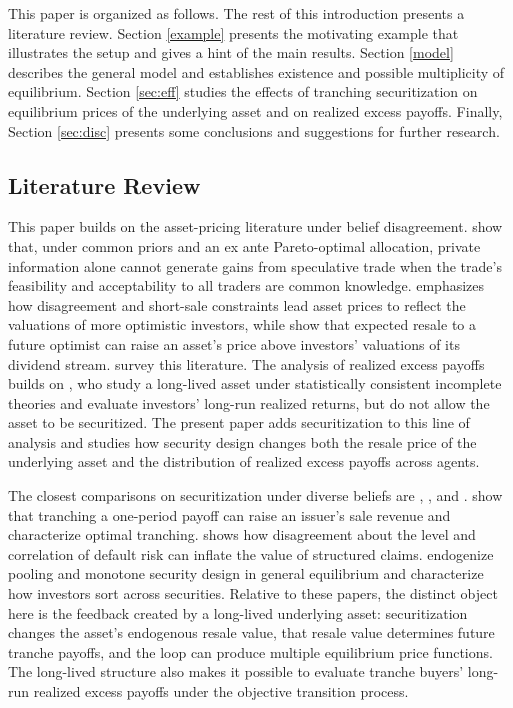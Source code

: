 \documentclass[11pt]{article}
\theoremstyle{plain}
\begin{document}
This paper is organized as follows. The rest of this introduction presents a literature review. Section \ref{example} presents the motivating example that illustrates the setup and gives a hint of the main results. Section \ref{model} describes the general model and establishes existence and possible multiplicity of equilibrium. Section \ref{sec:eff} studies the effects of tranching securitization on equilibrium prices of the underlying asset and on realized excess payoffs. Finally, Section \ref{sec:disc} presents some conclusions and suggestions for further research.

\subsection{Literature Review}

This paper builds on the asset-pricing literature under belief disagreement. \cite{MilgromStokey1982} show that, under common priors and an ex ante Pareto-optimal allocation, private information alone cannot generate gains from speculative trade when the trade's feasibility and acceptability to all traders are common knowledge. \cite{Miller1977} emphasizes how disagreement and short-sale constraints lead asset prices to reflect the valuations of more optimistic investors, while \cite{HarrisonKreps1978} show that expected resale to a future optimist can raise an asset's price above investors' valuations of its dividend stream. \cite{Scheinkman2004} survey this literature. The analysis of realized excess payoffs builds on \cite{EysterPiccione2014}, who study a long-lived asset under statistically consistent incomplete theories and evaluate investors' long-run realized returns, but do not allow the asset to be securitized. The present paper adds securitization to this line of analysis and studies how security design changes both the resale price of the underlying asset and the distribution of realized excess payoffs across agents.

The closest comparisons on securitization under diverse beliefs are \cite{GuoWangWei2014}, \cite{Broer2018}, and \cite{EllisPiccioneZhang2022}. \cite{GuoWangWei2014} show that tranching a one-period payoff can raise an issuer's sale revenue and characterize optimal tranching. \cite{Broer2018} shows how disagreement about the level and correlation of default risk can inflate the value of structured claims. \cite{EllisPiccioneZhang2022} endogenize pooling and monotone security design in general equilibrium and characterize how investors sort across securities. Relative to these papers, the distinct object here is the feedback created by a long-lived underlying asset: securitization changes the asset's endogenous resale value, that resale value determines future tranche payoffs, and the loop can produce multiple equilibrium price functions. The long-lived structure also makes it possible to evaluate tranche buyers' long-run realized excess payoffs under the objective transition process.
\end{document}
